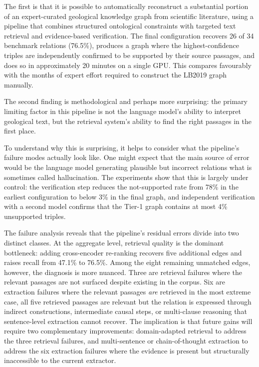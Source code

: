 \documentclass[10pt]{article}
\begin{document}
The first is that it is possible to automatically reconstruct a
substantial portion of an expert-curated geological knowledge graph
from scientific literature, using a pipeline that combines
structured ontological constraints with targeted text retrieval and
evidence-based verification.
The final configuration recovers 26 of 34 benchmark relations
(76.5\%), produces a graph where the highest-confidence triples are
independently confirmed to be supported by their source passages,
and does so in approximately 20 minutes on a single GPU.
This compares favourably with the months of expert effort required
to construct the LB2019 graph manually.

The second finding is methodological and perhaps more surprising:
the primary limiting factor in this pipeline is not the language
model's ability to interpret geological text, but the retrieval
system's ability to find the right passages in the first place.

To understand why this is surprising, it helps to consider what
the pipeline's failure modes actually look like.
One might expect that the main source of error would be the
language model generating plausible but incorrect relations  
what is sometimes called hallucination.
The experiments show that this is largely under control: the
verification step reduces the not-supported rate from 78\% in the
earliest configuration to below 3\% in the final graph, and
independent verification with a second model confirms that the
Tier-1 graph contains at most 4\% unsupported triples.

The failure analysis reveals that the pipeline's
residual errors divide into two distinct classes.
At the aggregate level, retrieval quality is the
dominant bottleneck: adding cross-encoder re-ranking
recovers five additional edges and raises recall
from 47.1\% to 76.5\%.
Among the eight remaining unmatched edges, however,
the diagnosis is more nuanced.
Three are retrieval failures where the relevant
passages are not surfaced despite existing in the
corpus.
Six are extraction failures where the relevant
passages \emph{are} retrieved in the most
extreme case, all five retrieved passages are
relevant but the relation is expressed through
indirect constructions, intermediate causal steps,
or multi-clause reasoning that sentence-level
extraction cannot recover.
The implication is that future gains will require
two complementary improvements: domain-adapted
retrieval to address the three retrieval failures,
and multi-sentence or chain-of-thought extraction
to address the six extraction failures where the
evidence is present but structurally inaccessible
to the current extractor.
\end{document}
